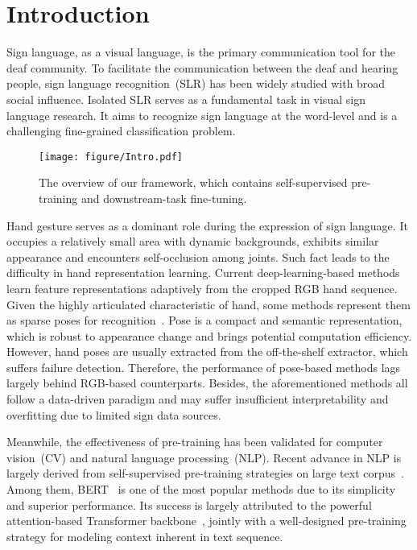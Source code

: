 \documentclass[10pt,twocolumn,letterpaper]{article}
\begin{document}
\section{Introduction}
Sign language, as a visual language, is the primary communication tool for the deaf community.
To facilitate the communication between the deaf and hearing people, sign language recognition~(SLR) has been widely studied with broad social influence.
Isolated SLR serves as a fundamental task in visual sign language research.
It aims to recognize sign language at the word-level and is a challenging fine-grained classification problem.


\begin{figure}
	\centering
	\texttt{[image: figure/Intro.pdf]}\caption{The overview of our framework, which contains self-supervised pre-training and downstream-task fine-tuning.}
	\label{fig:intro}
	\vspace{-0.4cm}
\end{figure}






Hand gesture serves as a dominant role during the expression of sign language.
It occupies a relatively small area with dynamic backgrounds, exhibits similar appearance and encounters self-occlusion among joints.
Such fact leads to the difficulty in hand representation learning.
Current deep-learning-based methods~\cite{camgoz2017subunets,koller2019weakly,huang2018video} learn feature representations adaptively from the cropped RGB hand sequence.
Given the highly articulated characteristic of hand, some methods represent them as sparse poses for recognition~\cite{albanie2020bsl,li2020word,joze2018ms}.
Pose is a compact and semantic representation, which is robust to appearance change and brings potential computation efficiency.
However, hand poses are usually extracted from the off-the-shelf extractor, which suffers failure detection.
Therefore, the performance of pose-based methods lags largely behind RGB-based counterparts.
Besides, the aforementioned methods all follow a data-driven paradigm and may suffer insufficient interpretability and overfitting due to limited sign data sources.

Meanwhile, the effectiveness of pre-training has been validated for computer vision~(CV) and natural language processing~(NLP).
Recent advance in NLP is largely derived from self-supervised pre-training strategies on large text corpus~\cite{radford2018improving,devlin2018bert,yang2019xlnet}.
Among them, BERT~\cite{devlin2018bert} is one of the most popular methods due to its simplicity and superior performance.
Its success is largely attributed to the powerful attention-based Transformer backbone~\cite{vaswani2017attention}, jointly with a well-designed pre-training strategy for modeling context inherent in text sequence.
\end{document}
